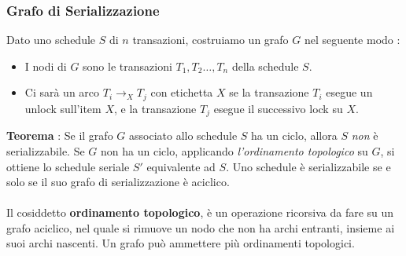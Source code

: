 \documentclass[12pt, letterpaper]{article}
\newcommand{\acc}{\\\hphantom{}\\}
\begin{document}
\subsubsection{Grafo di Serializzazione}
Dato uno schedule \(S\) di \(n\) transazioni, costruiamo un grafo \(G\) nel seguente modo : \begin{itemize}
    \item I nodi di \(G\) sono le transazioni \(T_1,T_2\dots,T_n\) della schedule \(S\).
    \item Ci sarà un arco \(T_i\rightarrow_X T_j\) con etichetta \(X\) se la transazione \(T_i\) esegue un unlock sull'item 
     \(X\), e la transazione \(T_j\) esegue il successivo lock su \(X\).
\end{itemize}
\begin{figure}[h]
\end{figure}
\textbf{Teorema} : Se il grafo \(G\) associato allo schedule \(S\) ha un ciclo, allora \(S\) \textit{non} è 
serializzabile. Se \(G\) non ha un ciclo, applicando \textit{l'ordinamento topologico} su \(G\), si ottiene lo schedule 
seriale \(S'\) equivalente ad \(S\). Uno schedule è serializzabile se e solo se il suo grafo di serializzazione è 
aciclico.\acc
Il cosiddetto \textbf{ordinamento topologico}, è un operazione ricorsiva da fare su un grafo aciclico, nel quale si rimuove un 
nodo che non ha archi entranti, insieme ai suoi archi nascenti. Un grafo può ammettere più ordinamenti topologici.\acc 
\end{document}
